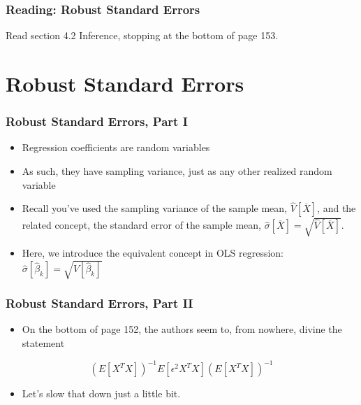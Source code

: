 \documentclass[12pt, block=fill]{beamer}
\newcommand{\paul}[1]{\textcolor{red}{#1}}
\begin{document}
\begin{frame}
  \frametitle{Reading: Robust Standard Errors}
  Read section 4.2 Inference, stopping at the bottom of page 153.
\end{frame}




\section{Robust Standard Errors} 

\begin{frame}
  \frametitle{Robust Standard Errors, Part I}

  \begin{itemize}
    \item Regression coefficients are random variables
    \item As such, they have sampling variance, just as any other realized random variable
    \item Recall you've used the sampling variance of the sample mean, $\hat{V}[\overline{X}]$, and the related concept, the standard error of the sample mean, $\hat{\sigma}[\overline{X}] = \sqrt{\hat{V}[\overline{X}]}$.
    \item Here, we introduce the equivalent concept in OLS regression:  $\hat{\sigma}[\hat{\beta}_{k}] = \sqrt{\hat{V}[\hat{\beta}_{k}]}$
  \end{itemize}
\end{frame}

\begin{frame}[t]
  \frametitle{Robust Standard Errors, Part II}

  \begin{itemize}
    \item On the bottom of page 152, the authors seem to, from nowhere, divine the statement
  \end{itemize}

  \[
    \left( E[X^{T}X]\right)^{-1} E[\epsilon^{2}X^{T}X] \left( E[X^{T}X]\right)^{-1}
  \]

  \begin{itemize}
      \item Let's slow that down just a little bit. 
  \end{itemize}
\end{frame}
\end{document}
